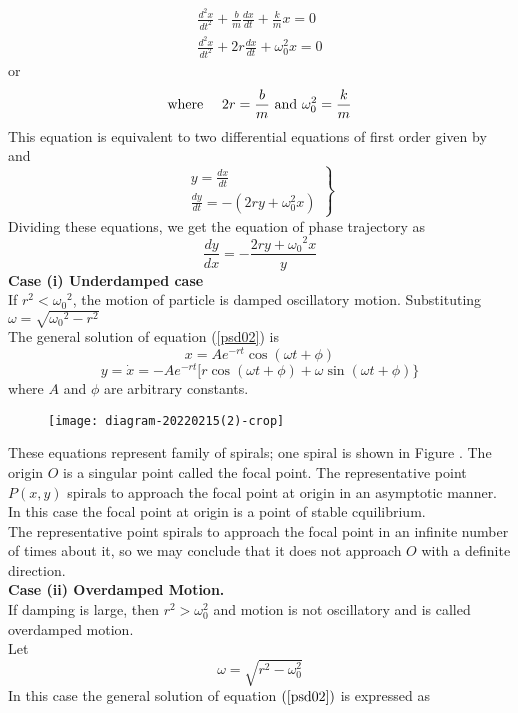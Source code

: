 $$
\begin{array}{l}
\frac{d^{2} x}{d t^{2}}+\frac{b}{m} \frac{d x}{d t}+\frac{k}{m} x=0 \\
\frac{d^{2} x}{d t^{2}}+2 r \frac{d x}{d t}+\omega_{0}^{2} x=0
\end{array}
$$
or\\
\begin{equation}
\text{where }\quad 2 r=\frac{b}{m}\text{ and }\omega_{0}^{2}=\frac{k}{m} \label{psd02}\\
\end{equation}
This equation is equivalent to two differential equations of first order given by
and
$$
\left.\begin{array}{l}
y=\frac{d x}{d t} \\
\frac{d y}{d t}=-\left(2 r y+\omega_{0}^{2} x\right)
\end{array}\right\}
$$
Dividing these equations, we get the equation of phase trajectory as
$$
\frac{d y}{d x}=-\frac{2 r y+\omega_{0}{ }^{2} x}{y}
$$
\textbf{Case (i) Underdamped case}\\
If $r^{2}<\omega_{0}{ }^{2}$, the motion of particle is damped oscillatory motion. Substituting $\omega=\sqrt{\omega_{0}{ }^{2}-r^{2}}$\\
The general solution of equation (\ref{psd02}) is 
$$x=A e^{-r t} \cos (\omega t+\phi)$$
$$y=\dot{x}=-A e^{-r t}[r \cos (\omega t+\phi)+\omega \sin (\omega t+\phi)\}$$where $A$ and $\phi$ are arbitrary constants.
\begin{figure}[H]
	\centering
	\texttt{[image: diagram-20220215(2)-crop]}
	\caption{}
	\label{}
\end{figure}
These equations represent family of spirals; one spiral is shown in Figure . The origin $O$ is a singular point called the focal point. The representative point $P(x, y)$ spirals to approach the focal point at origin in an asymptotic manner. In this case the focal point at origin is a point of stable cquilibrium.\\
The representative point spirals to approach the focal point in an infinite number of times about it, so we may conclude that it does not approach $O$ with a definite direction.\\
\textbf{Case (ii) Overdamped Motion. }\\
If damping is large, then $r^{2}>\omega_{0}^{2}$ and motion is not oscillatory and is called overdamped motion.\\
Let
$$
\omega=\sqrt{r^{2}-\omega_{0}^{2}}
$$
In this case the general solution of equation $(\ref{psd02})$ is expressed as \\
